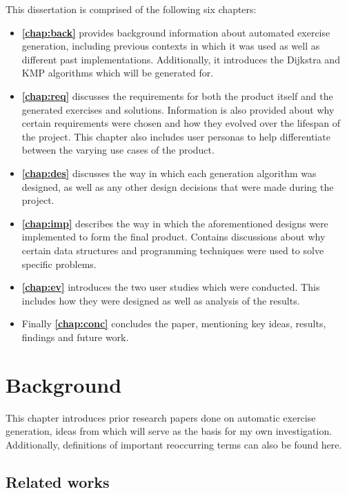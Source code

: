 \documentclass{l4proj}
\begin{document}
This dissertation is comprised of the following six chapters:
\begin{itemize}
	\item
	\textbf{\autoref{chap:back}} provides background information about automated exercise generation, including previous contexts in which it was used as well as different past implementations. Additionally, it introduces the Dijkstra and KMP algorithms which will be generated for.
	\item
	\textbf{\autoref{chap:req}} discusses the requirements for both the product itself and the generated exercises and solutions. Information is also provided about why certain requirements were chosen and how they evolved over the lifespan of the project. This chapter also includes user personas to help differentiate between the varying use cases of the product.
	\item
	\textbf{\autoref{chap:des}} discusses the way in which each generation algorithm was designed, as well as any other design decisions that were made during the project.
	\item
	\textbf{\autoref{chap:imp}} describes the way in which the aforementioned designs were implemented to form the final product. Contains discussions about why certain data structures and programming techniques were used to solve specific problems.
	\item
	\textbf{\autoref{chap:ev}} introduces the two user studies which were conducted. This includes how they were designed as well as analysis of the results.
	\item
	Finally \textbf{\autoref{chap:conc}} concludes the paper, mentioning key ideas, results, findings and future work.
\end{itemize}



\chapter{Background}
\label{chap:back}

This chapter introduces prior research papers done on automatic exercise generation, ideas from which will serve as the basis for my own investigation. Additionally, definitions of important reoccurring terms can also be found here.

\section{Related works}
\end{document}
